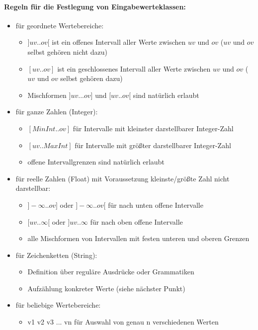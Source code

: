 \paragraph{Regeln für die Festlegung von Eingabewerteklassen:}
\begin{itemize}
	\item für geordnete Wertebereiche:
	\begin{itemize}
		\item $]uv..ov[$ ist ein offenes Intervall aller Werte zwischen $uv$ und $ov$ ($uv$ und $ov$ selbst gehören nicht dazu)
		\item $[uv..ov]$ ist ein geschlossenes Intervall aller Werte zwischen $uv$ und $ov$ ($uv$ und $ov$ selbst gehören dazu)
		\item Mischformen $]uv...ov]$ und $[uv..ov[$ sind natürlich erlaubt
	\end{itemize}
	\item für ganze Zahlen (Integer):
	\begin{itemize}
		\item $[MinInt..ov]$ für Intervalle mit kleinster darstellbarer Integer-Zahl
		\item $[uv..MaxInt]$ für Intervalle mit größter darstellbarer Integer-Zahl
		\item offene Intervallgrenzen sind natürlich erlaubt
	\end{itemize}
	\item für reelle Zahlen (Float) mit Voraussetzung kleinste/größte Zahl nicht darstellbar:
	\begin{itemize}
		\item $]-\infty..ov]$ oder $]-\infty..ov[$ für nach unten offene Intervalle
		\item $[uv..\infty[$ oder $]uv..\infty$ für nach oben offene Intervalle
		\item alle Mischformen von Intervallen mit festen unteren und oberen Grenzen
	\end{itemize}
	\item für Zeichenketten (String):
	\begin{itemize}
		\item Definition über reguläre Ausdrücke oder Grammatiken
		\item Aufzählung konkreter Werte (siehe nächster Punkt)
	\end{itemize}
	\item für beliebige Wertebereiche:
	\begin{itemize}
		\item {v1 v2 v3 ... vn} für Auswahl von genau n verschiedenen Werten

\end{itemize}
\end{itemize}
